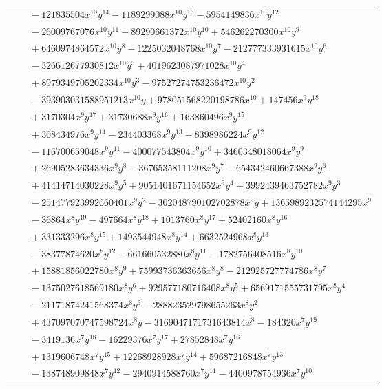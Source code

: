 \documentclass[11pt]{article}
\begin{document}
\begin{longtable}{@{}ll@{}}
 & $\quad -121835504x^{10}y^{14}-1189299088x^{10}y^{13}-5954149836x^{10}y^{12}$\\
 & $\quad -26009767076x^{10}y^{11}-89290661372x^{10}y^{10}+546262270300x^{10}y^{9}$\\
 & $\quad +6460974864572x^{10}y^{8}-1225032048768x^{10}y^{7}-212777333931615x^{10}y^{6}$\\
 & $\quad -326612677930812x^{10}y^{5}+4019623087971028x^{10}y^{4}$\\
 & $\quad +8979349705202334x^{10}y^{3}-97527274753236472x^{10}y^{2}$\\
 & $\quad -393903031588951213x^{10}y+978051568220198786x^{10}+147456x^{9}y^{18}$\\
 & $\quad +3170304x^{9}y^{17}+31730688x^{9}y^{16}+163860496x^{9}y^{15}$\\
 & $\quad +368434976x^{9}y^{14}-234403368x^{9}y^{13}-8398986224x^{9}y^{12}$\\
 & $\quad -116700659048x^{9}y^{11}-400077543804x^{9}y^{10}+3460348018064x^{9}y^{9}$\\
 & $\quad +26905283634336x^{9}y^{8}-36765358111208x^{9}y^{7}-654342460667388x^{9}y^{6}$\\
 & $\quad +41414714030228x^{9}y^{5}+9051401671154652x^{9}y^{4}+3992439463752782x^{9}y^{3}$\\
 & $\quad -251477923992660401x^{9}y^{2}-302048790102702878x^{9}y+1365989232574144295x^{9}$\\
 & $\quad -36864x^{8}y^{19}-497664x^{8}y^{18}+1013760x^{8}y^{17}+52402160x^{8}y^{16}$\\
 & $\quad +331333296x^{8}y^{15}+1493544948x^{8}y^{14}+6632524968x^{8}y^{13}$\\
 & $\quad -38377874620x^{8}y^{12}-661660532880x^{8}y^{11}-1782756408516x^{8}y^{10}$\\
 & $\quad +15881856022780x^{8}y^{9}+75993736363656x^{8}y^{8}-212925727774786x^{8}y^{7}$\\
 & $\quad -1375027618569180x^{8}y^{6}+929577180716408x^{8}y^{5}+6569171555731795x^{8}y^{4}$\\
 & $\quad -21171874241568374x^{8}y^{3}-288823529798655263x^{8}y^{2}$\\
 & $\quad +437097070747598724x^{8}y-3169047171731643814x^{8}-184320x^{7}y^{19}$\\
 & $\quad -3419136x^{7}y^{18}-16229376x^{7}y^{17}+27852848x^{7}y^{16}$\\
 & $\quad +1319606748x^{7}y^{15}+12268928928x^{7}y^{14}+59687216848x^{7}y^{13}$\\
 & $\quad -138748909848x^{7}y^{12}-2940914588760x^{7}y^{11}-4400978754936x^{7}y^{10}$\\

\end{longtable}
\end{document}
